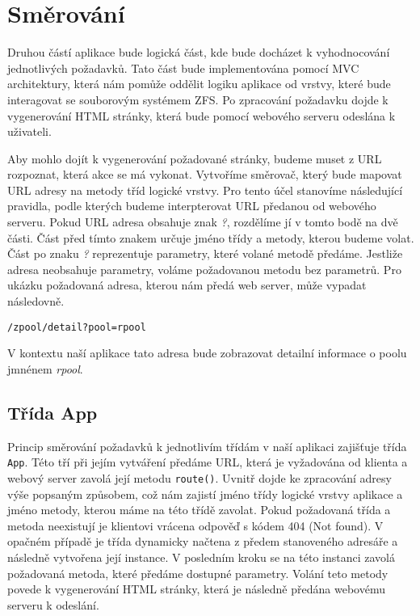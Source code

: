 \section{Směrování}
\label{route}
Druhou částí aplikace bude logická část, kde bude docházet k vyhodnocování jednotlivých požadavků. Tato část bude implementována pomocí MVC architektury, která nám pomůže oddělit logiku aplikace od vrstvy, které bude interagovat se souborovým systémem ZFS. Po zpracování požadavku dojde k vygenerování HTML stránky, která bude pomocí webového serveru odeslána k uživateli.

Aby mohlo dojít k vygenerování požadované stránky, budeme muset z URL rozpoznat, která akce se má vykonat. Vytvoříme směrovač, který bude mapovat URL adresy na metody tříd logické vrstvy. Pro tento účel stanovíme následující pravidla, podle kterých budeme interpterovat URL předanou od webového serveru. Pokud URL adresa obsahuje znak \emph{?}, rozdělíme jí v tomto bodě na dvě části. Část před tímto znakem určuje jméno třídy a metody, kterou budeme volat. Část po znaku \emph{?} reprezentuje parametry, které volané metodě předáme. Jestliže adresa neobsahuje parametry, voláme požadovanou metodu bez parametrů. Pro ukázku požadovaná adresa, kterou nám předá web server, může vypadat následovně.
\begin{verbatim}
/zpool/detail?pool=rpool
\end{verbatim}

V kontextu naší aplikace tato adresa bude zobrazovat detailní informace o poolu jmnénem \emph{rpool}.
    \subsection{Třída App}
    Princip směrování požadavků k jednotlivím třídám v naší aplikaci zajišťuje třída \verb|App|. Této tří při jejím vytváření předáme URL, která je vyžadována od klienta a webový server zavolá její metodu \verb|route()|. Uvnitř dojde ke zpracování adresy výše popsaným způsobem, což nám zajistí jméno třídy logické vrstvy aplikace a jméno metody, kterou máme na této třídě zavolat. Pokud požadovaná třída a metoda neexistují je klientovi vrácena odpověď s kódem 404 (Not found). V opačném případě je třída dynamicky načtena z předem stanoveného adresáře a následně vytvořena její instance. V posledním kroku se na této instanci zavolá požadovaná metoda, které předáme dostupné parametry. Volání teto metody povede k vygenerování HTML stránky, která je následně předána webovému serveru k odeslání.

